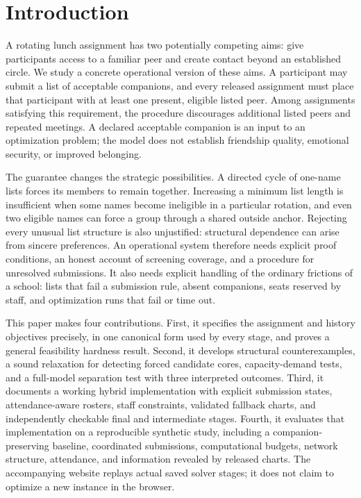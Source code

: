 \documentclass[11pt,a4paper]{article}
\theoremstyle{definition}\newtheorem{definition}[theorem]{Definition}
\theoremstyle{remark}\newtheorem{remark}[theorem]{Remark}
\begin{document}
\section{Introduction}
A rotating lunch assignment has two potentially competing aims: give participants access to a familiar peer and create contact beyond an established circle. We study a concrete operational version of these aims. A participant may submit a list of acceptable companions, and every released assignment must place that participant with at least one present, eligible listed peer. Among assignments satisfying this requirement, the procedure discourages additional listed peers and repeated meetings. A declared acceptable companion is an input to an optimization problem; the model does not establish friendship quality, emotional security, or improved belonging.

The guarantee changes the strategic possibilities. A directed cycle of one-name lists forces its members to remain together. Increasing a minimum list length is insufficient when some names become ineligible in a particular rotation, and even two eligible names can force a group through a shared outside anchor. Rejecting every unusual list structure is also unjustified: structural dependence can arise from sincere preferences. An operational system therefore needs explicit proof conditions, an honest account of screening coverage, and a procedure for unresolved submissions. It also needs explicit handling of the ordinary frictions of a school: lists that fail a submission rule, absent companions, seats reserved by staff, and optimization runs that fail or time out.

This paper makes four contributions. First, it specifies the assignment and history objectives precisely, in one canonical form used by every stage, and proves a general feasibility hardness result. Second, it develops structural counterexamples, a sound relaxation for detecting forced candidate cores, capacity-demand tests, and a full-model separation test with three interpreted outcomes. Third, it documents a working hybrid implementation with explicit submission states, attendance-aware rosters, staff constraints, validated fallback charts, and independently checkable final and intermediate stages. Fourth, it evaluates that implementation on a reproducible synthetic study, including a companion-preserving baseline, coordinated submissions, computational budgets, network structure, attendance, and information revealed by released charts. The accompanying website replays actual saved solver stages; it does not claim to optimize a new instance in the browser.
\end{document}
